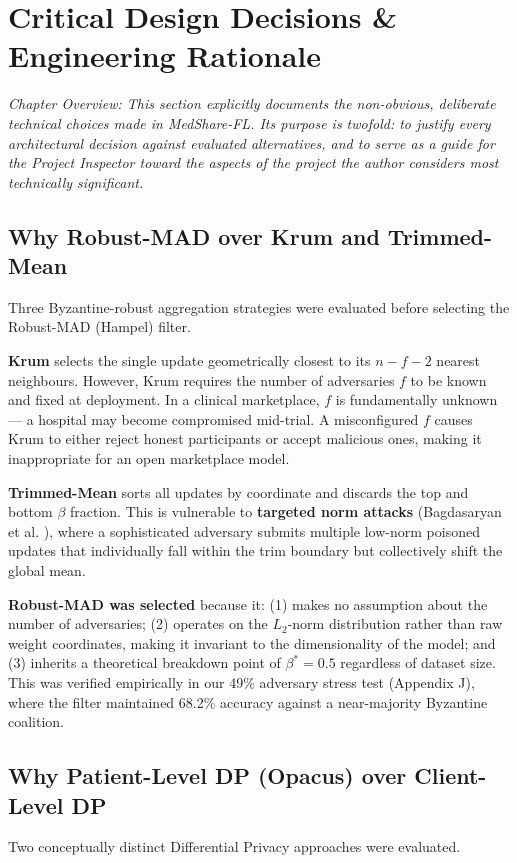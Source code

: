 \documentclass[10pt, a4paper, twocolumn]{article}
\begin{document}
\section{Critical Design Decisions \& Engineering Rationale}

\textit{Chapter Overview: This section explicitly documents the non-obvious, deliberate technical choices made in MedShare-FL. Its purpose is twofold: to justify every architectural decision against evaluated alternatives, and to serve as a guide for the Project Inspector toward the aspects of the project the author considers most technically significant.}

\subsection{Why Robust-MAD over Krum and Trimmed-Mean}
Three Byzantine-robust aggregation strategies were evaluated before selecting the Robust-MAD (Hampel) filter.

\textbf{Krum} \cite{blanchard2017} selects the single update geometrically closest to its $n-f-2$ nearest neighbours. However, Krum requires the number of adversaries $f$ to be known and fixed at deployment. In a clinical marketplace, $f$ is fundamentally unknown --- a hospital may become compromised mid-trial. A misconfigured $f$ causes Krum to either reject honest participants or accept malicious ones, making it inappropriate for an open marketplace model.

\textbf{Trimmed-Mean} sorts all updates by coordinate and discards the top and bottom $\beta$ fraction. This is vulnerable to \textbf{targeted norm attacks} (Bagdasaryan et al. \cite{bagdasaryan2020}), where a sophisticated adversary submits multiple low-norm poisoned updates that individually fall within the trim boundary but collectively shift the global mean.

\textbf{Robust-MAD was selected} because it: (1) makes no assumption about the number of adversaries; (2) operates on the $L_2$-norm distribution rather than raw weight coordinates, making it invariant to the dimensionality of the model; and (3) inherits a theoretical breakdown point of $\beta^* = 0.5$ regardless of dataset size. This was verified empirically in our 49\% adversary stress test (Appendix J), where the filter maintained 68.2\% accuracy against a near-majority Byzantine coalition.

\subsection{Why Patient-Level DP (Opacus) over Client-Level DP}
Two conceptually distinct Differential Privacy approaches were evaluated.
\end{document}
